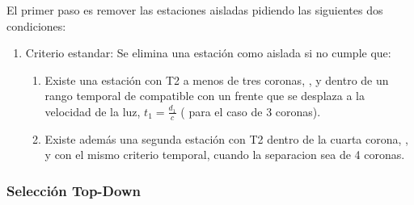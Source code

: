 	El primer paso es remover las estaciones aisladas pidiendo las siguientes dos condiciones:
	\begin{enumerate}
	 \item Criterio estandar: Se elimina una estación como aislada si no cumple que:
	 \begin{enumerate}
	  \item Existe una estación con T2 a menos de tres coronas, , y dentro de un rango temporal de compatible con un frente que se desplaza a la velocidad de la luz, $t_1=\frac{d_1}{c}$ ( para el caso de 3 coronas).
	  \item Existe adem\'as una segunda estación con T2 dentro de la cuarta corona, , y con el mismo criterio temporal,  cuando la separacion sea de 4 coronas.
	 \end{enumerate}
	\end{enumerate}
	
	\subsubsection{Selección Top-Down} 
	
